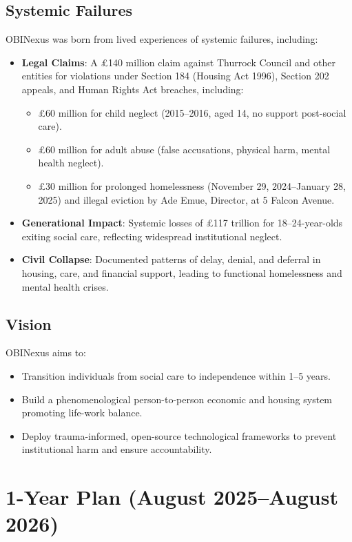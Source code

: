 \documentclass[12pt]{article}\usepackage[a4paper,margin=1in]{geometry}
\begin{document}
\subsection*{Systemic Failures}
OBINexus was born from lived experiences of systemic failures, including:
\begin{itemize}
    \item \textbf{Legal Claims}: A £140 million claim against Thurrock Council and other entities for violations under Section 184 (Housing Act 1996), Section 202 appeals, and Human Rights Act breaches, including:
        \begin{itemize}
            \item £60 million for child neglect (2015--2016, aged 14, no support post-social care).
            \item £60 million for adult abuse (false accusations, physical harm, mental health neglect).
            \item £30 million for prolonged homelessness (November 29, 2024--January 28, 2025) and illegal eviction by Ade Emue, Director, at 5 Falcon Avenue.
        \end{itemize}
    \item \textbf{Generational Impact}: Systemic losses of £117 trillion for 18--24-year-olds exiting social care, reflecting widespread institutional neglect.
    \item \textbf{Civil Collapse}: Documented patterns of delay, denial, and deferral in housing, care, and financial support, leading to functional homelessness and mental health crises.
\end{itemize}\subsection*{Vision}
OBINexus aims to:
\begin{itemize}
    \item Transition individuals from social care to independence within 1--5 years.
    \item Build a phenomenological person-to-person economic and housing system promoting life-work balance.
    \item Deploy trauma-informed, open-source technological frameworks to prevent institutional harm and ensure accountability.
\end{itemize}\section*{1-Year Plan (August 2025--August 2026)}
\end{document}
